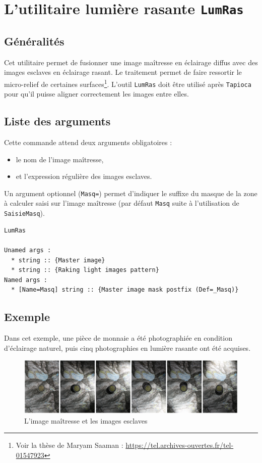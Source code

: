 \section{L'utilitaire lumi\`ere rasante {\tt LumRas}}

\subsection{G\'en\'eralit\'es}
Cet utilitaire permet de fusionner une image ma\^itresse en \'eclairage diffus avec des images esclaves en \'eclairage rasant. Le traitement permet de faire ressortir le micro-relief de certaines surfaces\footnote{Voir la th\`ese de Maryam Saaman : \url{https://tel.archives-ouvertes.fr/tel-01547923}}. L'outil {\tt LumRas} doit \^etre utilis\'e apr\`es {\tt Tapioca} pour qu'il puisse aligner correctement les images entre elles.

\subsection{Liste des arguments}
Cette commande attend deux arguments obligatoires :
\begin{itemize}
\item le nom de l'image ma\^itresse,
\item et l'expression r\'eguli\`ere des images esclaves.
\end{itemize}
Un argument optionnel ({\tt Masq=}) permet d'indiquer le suffixe du masque de la zone \`a calculer saisi sur l'image ma\^itresse (par d\'efaut {\tt Masq} suite \`a l'utilisation de {\tt SaisieMasq}).

\begin{verbatim}
LumRas

Unamed args :
  * string :: {Master image}
  * string :: {Raking light images pattern}
Named args :
  * [Name=Masq] string :: {Master image mask postfix (Def=_Masq)}

\end{verbatim}

\subsection{Exemple}
Dans cet exemple, une pi\`ece de monnaie a \'et\'e photographi\'ee en condition d'\'eclairage naturel, puis cinq photographies en lumi\`ere rasante ont \'et\'e acquises.

\begin{figure}[h!]
\centering
\includegraphics[width=\textwidth]{FIGS/LumRas/LumRasPanel.png}
\caption{L'image ma\^itresse et les images esclaves}
\end{figure}

